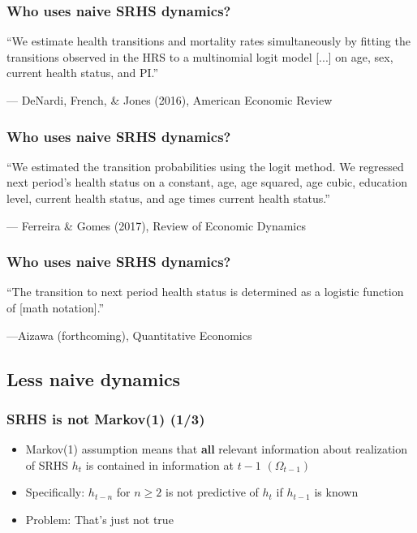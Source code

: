 \documentclass[aspectratio=169]{beamer}
\begin{document}
\begin{frame}\frametitle{Who uses naive SRHS dynamics?}

``We estimate health transitions and mortality rates simultaneously by fitting the transitions observed in the HRS to a multinomial logit model [...] on age, sex, current health status, and PI.''

\begin{center}
	--- DeNardi, French, \& Jones (2016), American Economic Review
\end{center}
\end{frame}


\begin{frame}\frametitle{Who uses naive SRHS dynamics?}

``We estimated the transition probabilities using the logit method. We regressed next period's health status on a constant, age, age squared, age cubic, education level, current health status, and age times current health status.''
\begin{center}
	--- Ferreira \& Gomes (2017), Review of Economic Dynamics
\end{center}
\end{frame}


\begin{frame}\frametitle{Who uses naive SRHS dynamics?}

``The transition to next period health status is determined as a logistic function of [math notation].''

\begin{center}
	---Aizawa (forthcoming), Quantitative Economics
\end{center}
\end{frame}



\subsection{Less naive dynamics}


\begin{frame}\frametitle{SRHS is not Markov(1) (1/3)}
\begin{itemize}
	\item <1->Markov(1) assumption means that \textbf{all} relevant information about realization of SRHS $h_t$ is contained in information at $t-1$ $(\Omega_{t-1})$
	
	\item <2->Specifically: $h_{t-n}$ for $n \geq 2$ is not predictive of $h_{t}$ if $h_{t-1}$ is known
	
	\item <3->Problem: That's just not true
\end{itemize}
\end{frame}
\end{document}
